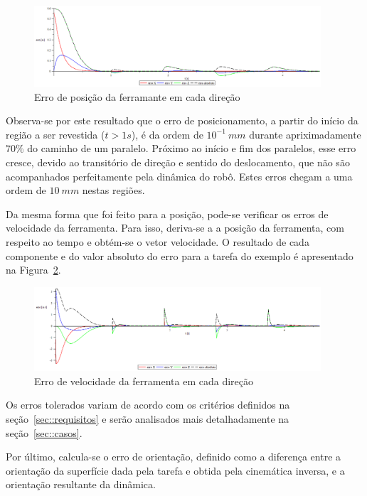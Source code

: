 \begin{figure}[h]
	\centering 
 	\includegraphics[width=0.95\textwidth]{figs/erros_exemplo}
 	\caption{Erro de posição da ferramante em cada direção}
 	\label{fig::erros_exemplo}
\end{figure}

Observa-se por este resultado que o erro de posicionamento, a partir do início
da região a ser revestida ($t>1s$), é da ordem de $10^{-1}~mm$ durante
apriximadamente $70\%$ do caminho de um paralelo. Próximo ao início e fim dos
paralelos, esse erro cresce, devido ao transitório de direção e sentido do
deslocamento, que não são acompanhados perfeitamente pela dinâmica do robô.
Estes erros chegam a uma ordem de $10~mm$ nestas regiões.

Da mesma forma que foi feito para a posição, pode-se verificar os erros de
velocidade da ferramenta. Para isso, deriva-se a a posição da ferramenta, com
respeito ao tempo e obtém-se o vetor velocidade. O resultado de cada componente
e do valor absoluto do erro para a tarefa do exemplo é apresentado na
Figura~\ref{fig::errovel_exemplo}.

\begin{figure}[h]
	\centering 
 	\includegraphics[width=0.95\textwidth]{figs/errovel_exemplo}
 	\caption{Erro de velocidade da ferramenta em cada direção}
 	\label{fig::errovel_exemplo}
\end{figure}

Os erros tolerados variam de acordo com os critérios definidos na
seção~\ref{sec::requisitos} e serão analisados mais detalhadamente na
seção~\ref{sec::casos}.

Por último, calcula-se o erro de orientação, definido como a diferença
entre a orientação da superfície dada pela tarefa e obtida pela cinemática
inversa, e a orientação resultante da dinâmica.


